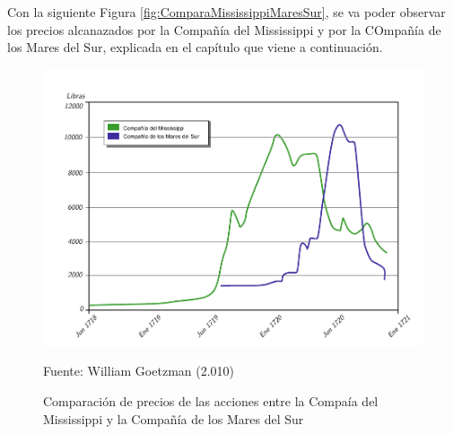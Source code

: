 Con la siguiente Figura \ref{fig:ComparaMississippiMaresSur}, se va poder observar los precios alcanazados por la Compañía del Mississippi y por la COmpañía de los Mares del Sur, explicada en el capítulo que viene a continuación.

\begin{figure}[!h] 
\caption{Comparación de precios de las acciones entre la Compaía del Mississippi y la Compañía de los Mares del Sur} 
\centering \includegraphics[width=150mm]{capitulos/graficos/ComparaMississippiMaresSur} 
\label{fig:preciosAccionesIndias} 

	\footnotesize
	Fuente: William Goetzman (2.010)

\end{figure}
